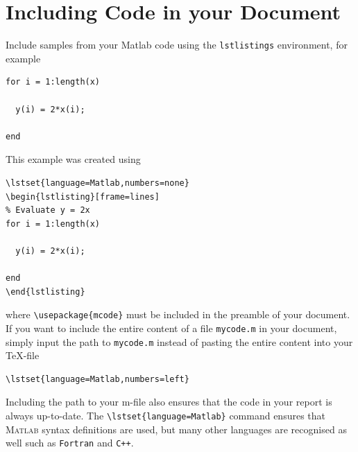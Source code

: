 \section{Including Code in your Document}
Include samples from your Matlab code using the \texttt{lstlistings} environment, for example
\lstset{language=Matlab,numbers=none}
\begin{lstlisting}[frame=lines]
% Evaluate y = 2x
for i = 1:length(x)

  y(i) = 2*x(i);

end
\end{lstlisting}
This example was created using
\begin{verbatim}
\lstset{language=Matlab,numbers=none}
\begin{lstlisting}[frame=lines]
% Evaluate y = 2x
for i = 1:length(x)

  y(i) = 2*x(i);

end
\end{lstlisting}
\end{verbatim}
where \texttt{\textbackslash usepackage\{mcode\}} must be included in the preamble of your document. If you want to include the entire content of a file \texttt{mycode.m} in your document, simply input the path to \texttt{mycode.m} instead of pasting the entire content into your \TeX -file
\begin{verbatim}
\lstset{language=Matlab,numbers=left}

\end{verbatim}
Including the path to your m-file also ensures that the code in your report is always up-to-date. The \texttt{\textbackslash lstset\{language=Matlab\}} command ensures that \textsc{Matlab} syntax definitions are used, but many other languages are recognised as well such as \texttt{Fortran} and \texttt{C++}.
